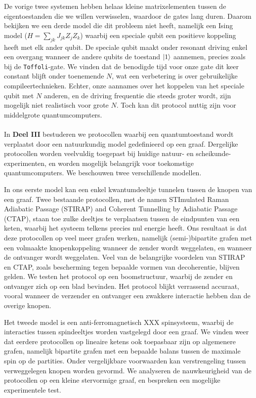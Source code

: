 De vorige twee systemen hebben helaas kleine matrixelementen tussen de eigentoestanden die we willen verwisselen, waardoor de gates lang duren. Daarom bekijken we een derde model die dit probleem niet heeft, namelijk een Ising model ($H = \sum_{jk} J_{jk} Z_j Z_k$) waarbij een speciale qubit een positieve koppeling heeft met elk ander qubit.  De speciale qubit maakt onder resonant driving enkel een overgang wanneer de andere qubits de toestand $\lvert1\rangle$ aannemen, precies zoals bij de \texttt{Toffoli}-gate. We vinden dat de benodigde tijd voor onze gate dit keer constant blijft onder toenemende $N$, wat een verbetering is over gebruikelijke compileertechnieken. Echter, onze aannames over het koppelen van het speciale qubit met $N$ anderen, en de driving frequentie die steeds groter wordt, zijn mogelijk niet realistisch voor grote $N$. Toch kan dit protocol nuttig zijn voor middelgrote quantumcomputers.


\paragraph{} 
In \textbf{Deel III} bestuderen we protocollen waarbij een quantumtoestand wordt verplaatst door een natuurkundig model gedefinieerd op een graaf. Dergelijke protocollen worden veelvuldig toegepast bij huidige natuur- en scheikunde-experimenten, en worden mogelijk belangrijk voor toekomstige quantumcomputers. We beschouwen twee verschillende modellen.

In ons eerste model kan een enkel kwantumdeeltje tunnelen tussen de knopen van een graaf. Twee bestaande protocollen, met de namen STImulated Raman Adiabatic Passage (STIRAP) and Coherent Tunnelling by Adiabatic Passage (CTAP), staan toe zulke deeltjes te verplaatsen tussen de eindpunten van een keten, waarbij het systeem telkens precies nul energie heeft. Ons resultaat is dat deze protocollen op veel meer grafen werken, namelijk (semi-)bipartite grafen met een volmaakte knopenkoppeling wanneer de zender wordt weggelaten, en wanneer de ontvanger wordt weggelaten. Veel van de belangrijke voordelen van STIRAP en CTAP, zoals bescherming tegen bepaalde vormen van decoherentie, blijven gelden. We testen het protocol op een boomstructuur, waarbij de zender en ontvanger zich op een blad bevinden. Het protocol blijkt verrassend accuraat, vooral wanneer de verzender en ontvanger een zwakkere interactie hebben dan de overige knopen. 

Het tweede model is een anti-ferromagnetisch XXX spinsysteem, waarbij de interacties tussen spindeeltjes worden vastgelegd door een graaf. We vinden weer dat eerdere protocollen op lineaire ketens ook toepasbaar zijn op algemenere grafen, namelijk bipartite grafen met een bepaalde balans tussen de maximale spin op de partities. Onder vergelijkbare voorwaarden kan verstrengeling tussen verweggelegen knopen worden gevormd. We analyseren de nauwkeurigheid van de protocollen op een kleine stervormige graaf, en bespreken een mogelijke experimentele test. 
